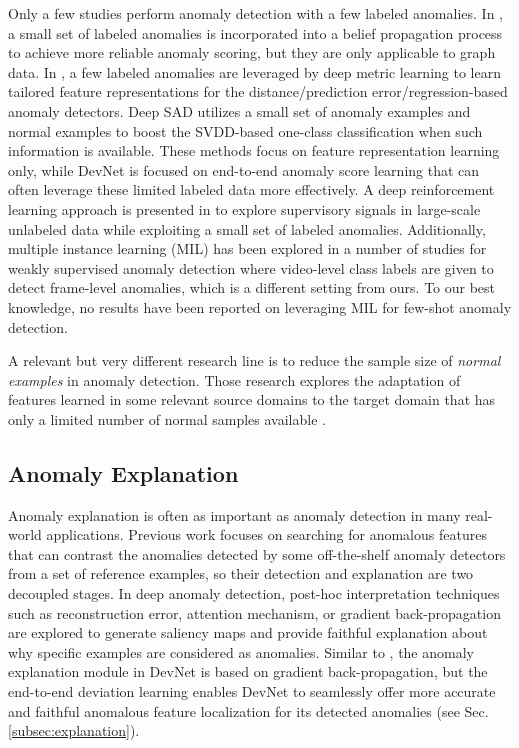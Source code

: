 \documentclass[10pt,journal,compsoc]{IEEEtran}
\begin{document}
Only a few studies perform 
anomaly detection with a few labeled anomalies. In \cite{mcglohon2009snare,tamersoy2014guilt}, a small set of labeled anomalies is incorporated into a belief propagation process to achieve more reliable anomaly scoring, but they are only applicable to graph data. In \cite{pang2018repen,liu2019margin,pang2019deep}, a few labeled anomalies are leveraged by deep metric learning to learn tailored feature representations for the distance/prediction error/regression-based anomaly detectors. Deep SAD \cite{ruff2020deep} utilizes a small set of anomaly examples and normal examples to boost the SVDD-based one-class classification when such information is available. These methods focus on feature representation learning only, while DevNet is focused on end-to-end anomaly score learning that can often leverage these limited labeled data more effectively. A deep reinforcement learning approach is presented in \cite{pang2021toward} to explore supervisory signals in large-scale unlabeled data while exploiting a small set of labeled anomalies. Additionally, multiple instance learning (MIL) has been explored in a number of studies \cite{sultani2018real,tian2021weakly} for weakly supervised anomaly detection where video-level class labels are given to detect frame-level anomalies, which is a different setting from ours. To our best knowledge, no results have been reported on leveraging MIL for few-shot anomaly detection.

A relevant but very different research line is to reduce the sample size of \textit{normal examples} in anomaly detection. Those research explores the adaptation of features learned in some relevant source domains to the target domain that has only a limited number of normal samples available \cite{lu2020few,reiss2021panda,sheynin2021hierarchical}. 


\subsection{Anomaly Explanation}

Anomaly explanation is often as important as anomaly detection in many real-world applications. Previous work \cite{angiulli2009explanation,vinh2016explanation,gupta2018beyond} focuses on searching for anomalous features that can contrast the anomalies detected by some off-the-shelf anomaly detectors from a set of reference examples, so their detection and explanation are two decoupled stages. In deep anomaly detection, post-hoc interpretation techniques such as reconstruction error, attention mechanism, or gradient back-propagation \cite{chen2021unsupervised,pang2020ranking,venkataramanan2020attention,salehi2021multiresolution} are explored to generate saliency maps and provide faithful explanation about why specific examples are considered as anomalies. Similar to \cite{venkataramanan2020attention,pang2020ranking,salehi2021multiresolution}, the anomaly explanation module in DevNet is based on gradient back-propagation, but the end-to-end deviation learning enables DevNet to seamlessly offer more accurate and faithful anomalous feature localization for its detected anomalies (see Sec. \ref{subsec:explanation}).
 
\end{document}
